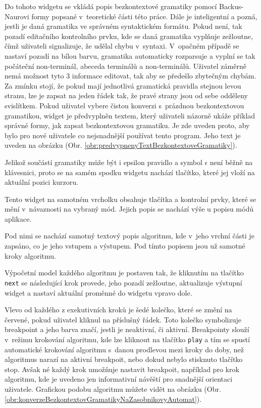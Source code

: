 Do tohoto widgetu se vkládá popis bezkontextové gramatiky pomocí Backus-Naurovi formy popsané v~teoretické části této práce. Dále je inteligentní a pozná, jestli je daná gramatika ve správném syntaktickém formátu. Pokud není, tak pozadí editačního kontrolního prvku, kde se daná gramatika vyplňuje zežloutne, čímž uživateli signalizuje, že udělal chybu v~syntaxi. V~opačném případě se nastaví pozadí na bílou barvu, gramatika automaticky rozparsuje a vyplní se tak počáteční non-terminál, abeceda terminálů a non-terminálů. Uživatel záměrně nemá možnost tyto 3 informace editovat, tak aby se předešlo zbytečným chybám. Za zmínku stojí, že pokud mají jednotlivá gramatická pravidla stejnou levou stranu, lze je zapsat na jeden řádek tak, že pravé strany jsou od sebe odděleny svislítkem. Pokud uživatel vybere čistou konverzi s~prázdnou bezkontextovou gramatikou, widget je předvyplněn textem, který uživateli názorně ukáže příklad správné formy, jak zapsat bezkontextovou gramatiku. Je zde uveden proto, aby bylo pro nové uživatele co nejsnadnější používat tento program. Jeho text je uveden na obrázku (Obr. \ref{obr:predvypnenyTextBezkontextoveGramatiky}). 

Jelikož součástí gramatiky může být i epsilon pravidlo a symbol $\epsilon$ není běžně na klávesnici, proto se na samém spodku widgetu nachází tlačítko, které jej vloží na aktuální pozici kurzoru.  



Tento widget na samotném vrcholku obsahuje tlačítka a kontrolní prvky, které se mění v~návaznosti na vybraný mód. Jejich popis se nachází výše u popisu módů aplikace.

Pod nimi se nachází samotný textový popis algoritmu, kde v~jeho vrchní části je zapsáno, co je jeho vstupem a výstupem. Pod tímto popisem jsou už samotné kroky algoritmu.

Výpočetní model každého algoritmu je postaven tak, že kliknutím na tlačítko \texttt{next} se následující krok provede, jeho pozadí zežloutne, aktualizuje výstupní widget a nastaví aktuální proměnné do widgetu vpravo dole. 

Vlevo od každého z exekutivních kroků je šedé kolečko, které se změní na červené, pokud uživatel kliknul na příslušný řádek. Toto kolečko symbolizuje breakpoint a jeho barva značí, jestli je neaktivní, či aktivní. Breakpointy slouží v~režimu krokování algoritmu, kde lze kliknout na tlačítko \texttt{play} a tím se spustí automatické krokování algoritmu s~danou prodlevou mezi kroky do doby, než algoritmus narazí na aktivní breakpoit, nebo dokud nebylo stisknuto tlačítko stop. Avšak né každý krok umožňuje nastavit breakpoit, například pro krok algoritmu, kde je uvedeno jen informativní návěští pro snadnější orientaci uživatele. Grafickou podobu algoritmu můžete vidět na obrázku (Obr. \ref{obr:konverzeBezkontextovGramatikyNaZasobnikovyAutomat}).

